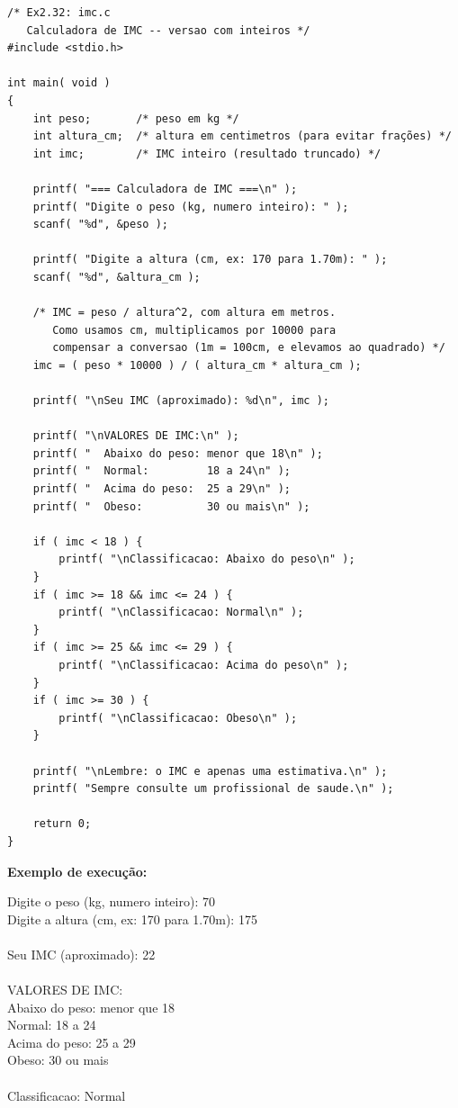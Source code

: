 \documentclass[12pt,a4paper]{article}
\begin{document}
\begin{respostabox}
\begin{lstlisting}
/* Ex2.32: imc.c
   Calculadora de IMC -- versao com inteiros */
#include <stdio.h>

int main( void )
{
    int peso;       /* peso em kg */
    int altura_cm;  /* altura em centimetros (para evitar frações) */
    int imc;        /* IMC inteiro (resultado truncado) */

    printf( "=== Calculadora de IMC ===\n" );
    printf( "Digite o peso (kg, numero inteiro): " );
    scanf( "%d", &peso );

    printf( "Digite a altura (cm, ex: 170 para 1.70m): " );
    scanf( "%d", &altura_cm );

    /* IMC = peso / altura^2, com altura em metros.
       Como usamos cm, multiplicamos por 10000 para
       compensar a conversao (1m = 100cm, e elevamos ao quadrado) */
    imc = ( peso * 10000 ) / ( altura_cm * altura_cm );

    printf( "\nSeu IMC (aproximado): %d\n", imc );

    printf( "\nVALORES DE IMC:\n" );
    printf( "  Abaixo do peso: menor que 18\n" );
    printf( "  Normal:         18 a 24\n" );
    printf( "  Acima do peso:  25 a 29\n" );
    printf( "  Obeso:          30 ou mais\n" );

    if ( imc < 18 ) {
        printf( "\nClassificacao: Abaixo do peso\n" );
    }
    if ( imc >= 18 && imc <= 24 ) {
        printf( "\nClassificacao: Normal\n" );
    }
    if ( imc >= 25 && imc <= 29 ) {
        printf( "\nClassificacao: Acima do peso\n" );
    }
    if ( imc >= 30 ) {
        printf( "\nClassificacao: Obeso\n" );
    }

    printf( "\nLembre: o IMC e apenas uma estimativa.\n" );
    printf( "Sempre consulte um profissional de saude.\n" );

    return 0;
}
\end{lstlisting}

\textbf{Exemplo de execução:}
\begin{saida}
Digite o peso (kg, numero inteiro): 70\\
Digite a altura (cm, ex: 170 para 1.70m): 175\\
\\
Seu IMC (aproximado): 22\\
\\
VALORES DE IMC:\\
\textvisiblespace\textvisiblespace Abaixo do peso: menor que 18\\
\textvisiblespace\textvisiblespace Normal:         18 a 24\\
\textvisiblespace\textvisiblespace Acima do peso:  25 a 29\\
\textvisiblespace\textvisiblespace Obeso:          30 ou mais\\
\\
Classificacao: Normal
\end{saida}
\end{respostabox}
\end{document}
